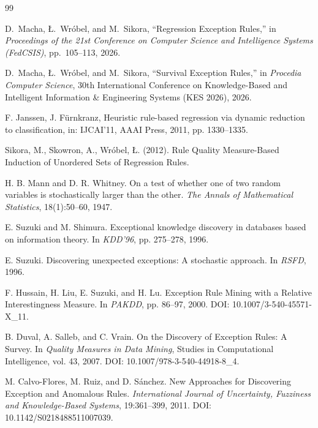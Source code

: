 

\begin{thebibliography}{99}


D.~Macha, {\L}.~Wr{\'o}bel, and M.~Sikora,
``Regression Exception Rules,''
in \emph{Proceedings of the 21st Conference on Computer Science and Intelligence Systems (FedCSIS)},
pp.~105--113, 2026.

D.~Macha, {\L}.~Wr{\'o}bel, and M.~Sikora,
``Survival Exception Rules,''
in \emph{Procedia Computer Science},
30th International Conference on Knowledge-Based and Intelligent Information \& Engineering Systems (KES 2026), 2026.

F. Janssen, J. Fürnkranz,
\newblock  Heuristic rule-based regression via dynamic reduction to classification, 
\newblock in: IJCAI’11, AAAI Press, 2011, pp. 1330–1335.


Sikora, M., Skowron, A., Wróbel, Ł. (2012). 
\newblock Rule Quality Measure-Based Induction of Unordered Sets of Regression Rules. 

H. B. Mann and D. R. Whitney.
\newblock On a test of whether one of two random variables is stochastically larger than the other.
\newblock \emph{The Annals of Mathematical Statistics}, 18(1):50--60, 1947.

E. Suzuki and M. Shimura. Exceptional knowledge discovery in
databases based on information theory. In \emph{KDD'96}, pp. 275--278, 1996.


E. Suzuki. Discovering unexpected exceptions:
A stochastic approach. In \emph{RSFD}, 1996.


F. Hussain, H. Liu, E. Suzuki, and H. Lu. Exception Rule Mining
with a Relative Interestingness Measure. In \emph{PAKDD}, pp. 86--97, 2000.
DOI: 10.1007/3-540-45571-X\_11.


B. Duval, A. Salleb, and C. Vrain. On the Discovery of Exception
Rules: A Survey. In \emph{Quality Measures in Data Mining}, Studies in
Computational Intelligence, vol. 43, 2007.
DOI: 10.1007/978-3-540-44918-8\_4.


M. Calvo-Flores, M. Ruiz, and D. Sánchez. New Approaches
for Discovering Exception and Anomalous Rules. \emph{International Journal of
Uncertainty, Fuzziness and Knowledge-Based Systems}, 19:361--399, 2011.
DOI: 10.1142/S0218488511007039.



\end{thebibliography}
